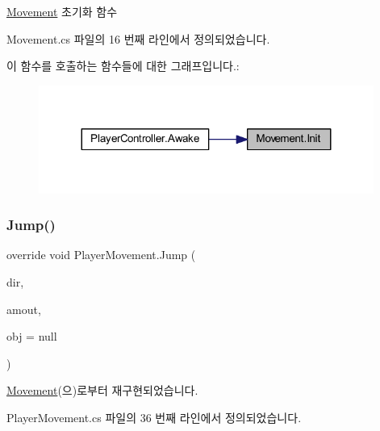 \mbox{\hyperlink{class_movement}{Movement}} 초기화 함수 



Movement.\+cs 파일의 16 번째 라인에서 정의되었습니다.


\begin{DoxyCode}{0}

\end{DoxyCode}
이 함수를 호출하는 함수들에 대한 그래프입니다.\+:
\nopagebreak
\begin{figure}[H]
\begin{center}
\leavevmode
\includegraphics[width=311pt]{d1/de2/class_movement_a1c50c07edbe274e1cf55253e87506684_icgraph}
\end{center}
\end{figure}
\mbox{\label{class_player_movement_a64ce92029a6d91f12d23332bdd44a6ab}} 
\subsubsection{\texorpdfstring{Jump()}{Jump()}}
{\footnotesize\ttfamily override void Player\+Movement.\+Jump (\begin{DoxyParamCaption}\item[{Vector2}]{dir,  }\item[{float}]{amout,  }\item[{Game\+Object}]{obj = {\ttfamily null} }\end{DoxyParamCaption})\hspace{0.3cm}{\ttfamily [virtual]}}



\mbox{\hyperlink{class_movement_a561e8f643a3f3cd6b0b6789c72161e98}{Movement}}(으)로부터 재구현되었습니다.



Player\+Movement.\+cs 파일의 36 번째 라인에서 정의되었습니다.



